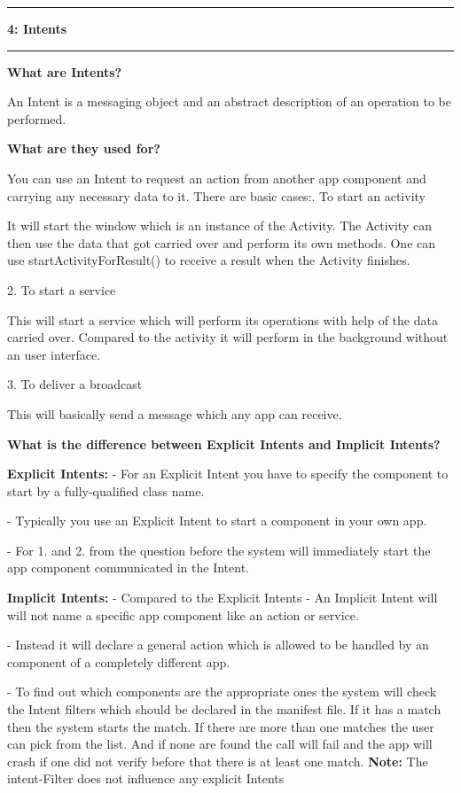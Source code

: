 \documentclass[11pt]{article}
\newcommand\question[2]{\vspace{.25in}\hrule\textbf{#1: #2}\vspace{.5em}\hrule\vspace{.10in}}
\begin{document}
\question{4}{Intents} 

\textbf {What are Intents?}

An Intent is a messaging object and an abstract description of an operation to be performed.

\textbf{What are they used for? }

You can use an Intent to request an action from another app component and carrying any necessary data to it.
There are basic cases:. To start an activity
	
It will start the window which is an instance of the Activity. 
The Activity can then use the data that got carried over and perform its own methods.
One can use startActivityForResult() to receive a result when the Activity finishes.
 
2. To start a service

This will start a service which will perform its operations with help of the data carried over.
Compared to the activity it will perform in the background without an user interface.

3. To deliver a broadcast

This will basically send a message which any app can receive.

\textbf {What is the difference between Explicit Intents and Implicit Intents?}

\textbf{Explicit Intents:}\newline
- For an Explicit Intent you have to specify the component to start by a fully-qualified class name.

- Typically you use an Explicit Intent to start a component in your own app.

- For 1. and 2. from the question before the system will immediately start the app component communicated in the Intent.

\textbf{Implicit Intents:}\newline
- Compared to the Explicit Intents - An Implicit Intent will will not name a specific app component like an action or service.

- Instead it will declare a general action which is allowed to be handled by an component of    a completely different app. 	

- To find out which components are the appropriate ones the system will check the Intent filters which should be declared in the manifest file.
If it has a match then the system starts the match. If there are more than one matches the user can pick from the list.
And if none are found the call will fail and the app will crash if one did not verify before that there is at least one match.\newline
\textbf{Note:} The intent-Filter does not influence any explicit Intents
\end{document}
